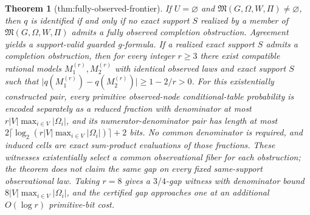 \documentclass{article}
\newtheorem{theorem}{Theorem}
\begin{document}
\begin{theorem}[thm:fully-observed-frontier]\label{thm:fully-observed-frontier}
If \(U=\varnothing\) and \(\mathfrak M(G,\Omega,W,\Pi)\ne\varnothing\), then \(q\) is identified if and only if no exact support \(S\) realized by a member of \(\mathfrak M(G,\Omega,W,\Pi)\) admits a fully observed completion obstruction. Agreement yields a support-valid guarded g-formula. If a realized exact support \(S\) admits a completion obstruction, then for every integer \(r\geq 3\) there exist compatible rational models \(M_1^{(r)},M_2^{(r)}\) with identical observed laws and exact support \(S\) such that \(\lvert q(M_1^{(r)})-q(M_2^{(r)})\rvert\geq 1-2/r>0\). For this existentially constructed pair, every primitive observed-node conditional-table probability is encoded separately as a reduced fraction with denominator at most \(r|V|\max_{i\in V}|\Omega_i|\), and its numerator-denominator pair has length at most \(2\lceil\log_2(r|V|\max_{i\in V}|\Omega_i|)\rceil+2\) bits. No common denominator is required, and induced cells are exact sum-product evaluations of those fractions. These witnesses existentially select a common observational fiber for each obstruction; the theorem does not claim the same gap on every fixed same-support observational law. Taking \(r=8\) gives a \(3/4\)-gap witness with denominator bound \(8|V|\max_{i\in V}|\Omega_i|\), and the certified gap approaches one at an additional \(O(\log r)\) primitive-bit cost.
\end{theorem}
\end{document}
